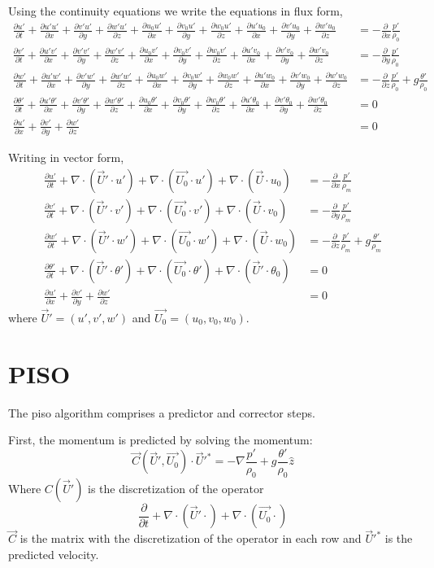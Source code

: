 \documentclass[a4paper,10pt]{article}
\newcommand{\pd}[2]{\frac{\partial #1}{\partial #2}}
\newcommand{\fluxf}[4]{\pd{#1}{t} + \pd{#2#1}{x} + \pd{#3#1}{y} + \pd{#4#1}{z}}
\newcommand{\CDf}[4]{\pd{#2#1}{x} + \pd{#3#1}{y} + \pd{#4#1}{z}}
\begin{document}
Using the continuity equations we write the equations in flux form, 
\begin{equation}
  \begin{align}
    \fluxf{u'}{u'}{v'}{w'} + \CDf{u'}{u_0}{v_0}{w_0} + \CDf{u_0}{u'}{v'}{w'} &= -\pd{\,}{x}\frac{p'}{\rho_0} \\
    \fluxf{v'}{u'}{v'}{w'} + \CDf{v'}{u_0}{v_0}{w_0} + \CDf{v_0}{u'}{v'}{w'} &= -\pd{\,}{y}\frac{p'}{\rho_0} \\
    \fluxf{w'}{u'}{v'}{w'} + \CDf{w'}{u_0}{v_0}{w_0} + \CDf{w_0}{u'}{v'}{w'} &= -\pd{\,}{z}\frac{p'}{\rho_0} + g\frac{\theta'}{\rho_0}\\
    \fluxf{\theta'}{u'}{v'}{w'} + \CDf{\theta'}{u_0}{v_0}{w_0} + \CDf{\theta_0}{u'}{v'}{w'} &= 0\\
    \pd{u'}{x}  + \pd{v'}{y} + \pd{w'}{z} &= 0    
  \end{align}
\end{equation}

Writing in vector form, 
\begin{equation}
  \begin{align}
    \pd{u'}{t} + \nabla\cdot (\vec{U}'\cdot u') + \nabla\cdot (\vec{U_0}\cdot u') + \nabla\cdot (\vec{U}\cdot u_0) &=  -\pd{\,}{x}\frac{p'}{\rho_m} \\
    \pd{v'}{t} + \nabla\cdot (\vec{U}'\cdot v') + \nabla\cdot (\vec{U_0}\cdot v') + \nabla\cdot (\vec{U}\cdot v_0) &=  -\pd{\,}{y}\frac{p'}{\rho_m} \\
    \pd{w'}{t} + \nabla\cdot (\vec{U}'\cdot w') + \nabla\cdot (\vec{U_0}\cdot w') + \nabla\cdot (\vec{U}\cdot w_0) &=  -\pd{\,}{z}\frac{p'}{\rho_m} + g\frac{\theta'}{\rho_m}\\
    \pd{\theta'}{t} + \nabla\cdot (\vec{U}'\cdot \theta')+ \nabla\cdot (\vec{U_0}\cdot \theta') + \nabla\cdot (\vec{U}'\cdot \theta_0) &= 0\\
    \pd{u'}{x}  + \pd{v'}{y} + \pd{w'}{z} &= 0    
  \end{align}
\end{equation}
where $\vec{U}'=(u',v',w')$ and $\vec{U_0}=(u_0,v_0,w_0)$. 

\section{PISO}

The piso algorithm comprises a predictor and corrector steps. 

First, the momentum is predicted by solving the momentum:
\begin{equation}
\vec{C}(\vec{U}',\vec{U_0}) \cdot \vec{U}'^{*} = -\nabla\frac{p'}{\rho_0} + g\frac{\theta'}{\rho_0}\hat{z}
\end{equation}
Where $C(\vec{U}')$ is the discretization of the operator
\begin{equation}
   \pd{}{t} + \nabla\cdot (\vec{U}'\cdot ) + \nabla\cdot (\vec{U_0}\cdot )
\end{equation}
$\vec{C}$ is the matrix with the discretization of the operator in each row
and $\vec{U}'^{*}$ is the predicted velocity.  
\end{document}
